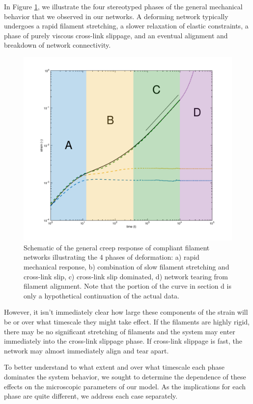 \documentclass[pre,preprint]{revtex4-1}
\begin{document}
In Figure \ref{fig:shear_modes}, we illustrate the four stereotyped phases of the general mechanical behavior that we observed in our networks.  A deforming network typically undergoes a rapid filament stretching, a slower relaxation of elastic constraints, a phase of purely viscous cross-link slippage, and an eventual alignment and breakdown of network connectivity.


\begin{figure}[h!]
\centering
\includegraphics[width=\hsize]{shear_modes_b}
\caption{ \label{fig:shear_modes} Schematic of the general creep response of compliant filament networks illustrating the 4 phases of deformation: a) rapid mechanical response, b) combination of slow filament stretching and cross-link slip, c) cross-link slip dominated, d) network tearing from filament alignment. Note that the portion of the curve in section d is only a hypothetical continuation of the actual data.  }
\end{figure}

However, it isn't immediately clear how large these components of the strain will be or over what timescale they might take effect.  If the filaments are highly rigid, there may be no significant stretching of filaments and the system may enter immediately into the cross-link slippage phase.  If cross-link slippage is fast, the network may almost immediately align and tear apart.

To better understand to what extent and over what timescale each phase dominates the system behavior, we sought to determine the dependence of these effects on the microscopic parameters of our model.  As the implications for each phase are quite different, we address each case separately.
\end{document}
